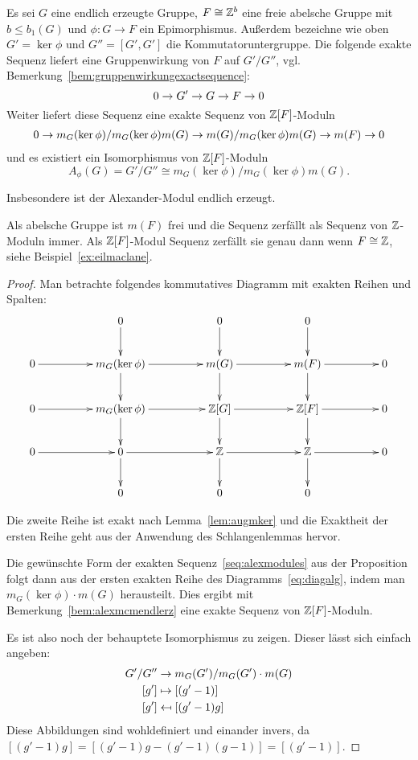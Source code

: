 \begin{prop}
\label{prop:alexmodules}
	Es sei $G$ eine endlich erzeugte Gruppe, $F \cong \mathbb{Z}^b$ eine freie abelsche Gruppe mit $b\leq b_1(G)$ und $\phi: G \to F$ ein Epimorphismus. Außerdem bezeichne wie oben $G'=\ker\phi$ und $G''=[G',G']$ die Kommutatoruntergruppe. Die folgende exakte Sequenz liefert eine Gruppenwirkung von $F$ auf $G'/G''$, vgl.\,Bemerkung~\ref{bem:gruppenwirkungexactsequence}:
	\[
		0\to G'\to G\to F\to0
	\]
	Weiter liefert diese Sequenz eine exakte Sequenz von $\mathbb{Z}[F]$-Moduln
		\begin{align}
		0\to m_G(\ker\phi)/m_G(\ker\phi)m(G)\to m(G)/m_G(\ker\phi)m(G)\to m(F)\to0 \label{seq:alexmodules}
		\end{align}
		und es existiert ein Isomorphismus von $\mathbb{Z}[F]$-Moduln 
		\[A_\phi(G) = G'/G'' \cong m_G(\ker\phi)/m_G(\ker\phi)m(G).\]

	Insbesondere ist der Alexander-Modul endlich erzeugt.
\end{prop}
\begin{bem}
	Als abelsche Gruppe ist $m(F)$ frei und die Sequenz zerfällt als Sequenz von $\mathbb{Z}$-Moduln immer. Als $\mathbb{Z}[F]$-Modul Sequenz zerfällt sie genau dann wenn $F\cong \mathbb{Z}$, siehe Beispiel~\ref{ex:eilmaclane}.
\end{bem}
\begin{proof}
		Man betrachte folgendes kommutatives Diagramm mit exakten Reihen und Spalten:	
		\begin{equation}
		\label{eq:diagalg}
			\begin{xy}
				\xymatrixcolsep{4pc}\xymatrix{	
									& 0 \ar[d] & 0\ar[d] & 0\ar[d]&\\
							0 \ar[r]&	m_G(\ker\phi) \ar[r] \ar[d]&	m(G) \ar[r] \ar[d]& m(F) \ar[r] \ar[d]&	0\\
							0 \ar[r]&	m_G(\ker\phi) \ar[r] \ar[d]&	\ZZ[G] \ar[r] \ar[d]& \ZZ[F] \ar[r] \ar[d]&	0\\
							0 \ar[r]&		0	\ar[d]\ar[r] 	&	\ZZ \ar[d] \ar[r]	&	\ZZ \ar[r] \ar[d] &		0\\
							&0&0&0&}
			\end{xy}
		\end{equation}

		Die zweite Reihe ist exakt nach Lemma~\ref{lem:augmker} und die Exaktheit der ersten Reihe geht aus der Anwendung des Schlangenlemmas hervor.

		Die gewünschte Form der exakten Sequenz~\eqref{seq:alexmodules} aus der Proposition folgt dann aus der ersten exakten Reihe des Diagramms~\eqref{eq:diagalg}, indem man $m_G(\ker\phi)\cdot m(G)$ herausteilt. Dies ergibt mit Bemerkung~\ref{bem:alexmcmendlerz} eine exakte Sequenz von $\mathbb{Z}[F]$-Moduln.

		Es ist also noch der behauptete Isomorphismus zu zeigen. Dieser lässt sich einfach angeben:
		\begin{align*}
			G'/G'' 	&\to 		m_G(G')/m_G(G')\cdot m(G)\\
			[g']		&\mapsto	[(g'-1)]\\
			[g']		&\mathrel{\reflectbox{\ensuremath{\mapsto}}}  [(g'-1)g]
		\end{align*}
		Diese Abbildungen sind wohldefiniert und einander invers, da $[(g'-1)g]=[(g'-1)g-(g'-1)(g-1)]=[(g'-1)]$.
	\end{proof}	

